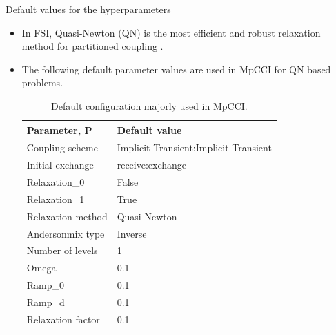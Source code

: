 \documentclass[10pt]{beamer}
\begin{document}
\begin{frame}{Default values for the hyperparameters}
\begin{itemize}
    \item  In FSI, Quasi-Newton (QN) is the most efficient and robust relaxation method for partitioned coupling \cite{robustqn} \cite{robustqn2}. 
    \item The following default parameter values are used in MpCCI for QN based problems.
    
\begin{table}[htbp]
\begin{center}
\begin{tabular}{|l|l|}
\hline
\textbf{Parameter, P} & \textbf{Default value} \\ \hline
Coupling scheme & Implicit-Transient:Implicit-Transient\\ \hline
Initial exchange & receive:exchange \\ \hline
Relaxation\_0 & False  \\ \hline
Relaxation\_1 & True  \\ \hline
Relaxation method & Quasi-Newton \\ \hline
Andersonmix type & Inverse  \\ \hline
Number of levels  & 1 \\ \hline
Omega & 0.1  \\ \hline
Ramp\_0 & 0.1 \\ \hline
Ramp\_d & 0.1 \\ \hline
Relaxation factor & 0.1 \\ \hline
\end{tabular}
\end{center}
\captionsetup{justification=justified}
\caption[Default parameter configuration of MpCCI]{Default configuration majorly used in MpCCI.}
\label{table:parameterdefaultvalues}
\end{table}

\end{itemize}

\end{frame}
\end{document}
